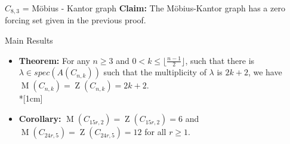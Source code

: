 \documentclass[final]{beamer}
\newcommand{\M}{\operatorname{M}}
\newcommand{\Z}{\operatorname{Z}}
\newcommand{\bit}{\begin{itemize}}
\newcommand{\eit}{\end{itemize}}
\begin{document}
\begin{frame}{}
\begin{columns}[t]
\begin{column}{0.38 \linewidth}
\begin{block}{$C_{8,3}$ = M\"{o}bius - Kantor graph}
\textbf{Claim:} The M\"{o}bius-Kantor graph has a zero forcing set given in the previous proof.
\begin{figure}[h!]
\centering
{}
\end{figure}

\end{block}
        
\begin{block}{Main Results}
\bit
\item[]{\bf Theorem:} For any $n \geq 3$ and $0 <  k  \leq \lfloor \frac{n-1}{2} \rfloor$, such that there is $\lambda \in spec(A(C_{n,k}))$ such that the multiplicity of $\lambda$ is  $2k+2$, we have $\M(C_{n,k}) = \Z(C_{n,k}) = 2k+2$.\\*[1cm]

\item[]{\bf Corollary:} $\M(C_{15r,2}) = \Z(C_{15r,2}) = 6$ and 
$\M(C_{24r,5}) = \Z(C_{24r,5}) = 12$ for all $r \geq 1$.
\eit
\end{block}


\end{column}
\end{columns}
\end{frame}
\end{document}
